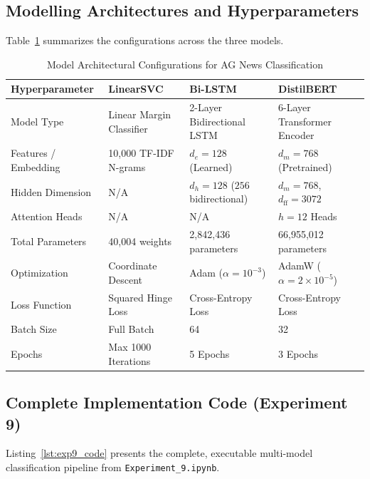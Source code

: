 \documentclass[12pt,a4paper]{report}
\begin{document}
\subsection{Modelling Architectures and Hyperparameters}
Table~\ref{tab:exp9_models} summarizes the configurations across the three models.

\begin{table}[H]
\centering
\caption{Model Architectural Configurations for AG News Classification}
\label{tab:exp9_models}
\begin{tabularx}{\textwidth}{lXXX}
\toprule
\textbf{Hyperparameter} & \textbf{LinearSVC} & \textbf{Bi-LSTM} & \textbf{DistilBERT} \\
\midrule
Model Type & Linear Margin Classifier & 2-Layer Bidirectional LSTM & 6-Layer Transformer Encoder \\
Features / Embedding & 10,000 TF-IDF N-grams & $d_e = 128$ (Learned) & $d_m = 768$ (Pretrained) \\
Hidden Dimension & N/A & $d_h = 128$ ($256$ bidirectional) & $d_m = 768$, $d_{\text{ff}} = 3072$ \\
Attention Heads & N/A & N/A & $h = 12$ Heads \\
Total Parameters & 40,004 weights & 2,842,436 parameters & 66,955,012 parameters \\
Optimization & Coordinate Descent & Adam ($\alpha = 10^{-3}$) & AdamW ($\alpha = 2 \times 10^{-5}$) \\
Loss Function & Squared Hinge Loss & Cross-Entropy Loss & Cross-Entropy Loss \\
Batch Size & Full Batch & 64 & 32 \\
Epochs & Max 1000 Iterations & 5 Epochs & 3 Epochs \\
\bottomrule
\end{tabularx}
\end{table}

\subsection{Complete Implementation Code (Experiment 9)}
Listing~\ref{lst:exp9_code} presents the complete, executable multi-model classification pipeline from \texttt{Experiment\_9.ipynb}.
\end{document}
